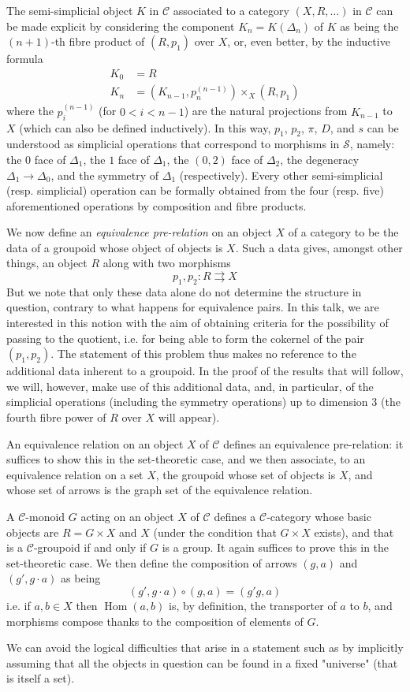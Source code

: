 The semi-simplicial object $K$ in $\mathcal{C}$ associated to a category $(X,R,\ldots)$ in $\mathcal{C}$ can be made explicit by considering the component $K_n=K(\Delta_n)$ of $K$ as being the $(n+1)$-th fibre product of $(R,p_1)$ over $X$, or, even better, by the inductive formula
\[
    \begin{aligned}
        K_0 & = R
        \\K_n &= (K_{n-1},p_n^{(n-1)})\times_X(R,p_1)
    \end{aligned}
\]
where the $p_i^{(n-1)}$ (for $0<i<n-1$) are the natural projections from $K_{n-1}$ to $X$ (which can also be defined inductively).
In this way, $p_1$, $p_2$, $\pi$, $D$, and $s$ can be understood as simplicial operations that correspond to morphisms in $\mathcal{S}$, namely: the $0$ face of $\Delta_1$, the $1$ face of $\Delta_1$, the $(0,2)$ face of $\Delta_2$, the degeneracy $\Delta_1\to\Delta_0$, and the symmetry of $\Delta_1$ (respectively).
Every other semi-simplicial (resp. simplicial) operation can be formally obtained from the four (resp. five) aforementioned operations by composition and fibre products.

We now define an \emph{equivalence pre-relation} on an object $X$ of a category to be the data of a groupoid whose object of objects is $X$.
Such a data gives, amongst other things, an object $R$ along with two morphisms
\[
    p_1,p_2\colon R\rightrightarrows X
\]
But we note that only these data alone do not determine the structure in question, contrary to what happens for equivalence pairs.
In this talk, we are interested in this notion with the aim of obtaining criteria for the possibility of passing to the quotient, i.e. for being able to form the cokernel of the pair $(p_1,p_2)$.
The statement of this problem thus makes no reference to the additional data inherent to a groupoid.
In the proof of the results that will follow, we will, however, make use of this additional data, and, in particular, of the simplicial operations (including the symmetry operations) up to dimension $3$ (the fourth fibre power of $R$ over $X$ will appear).

An equivalence relation on an object $X$ of $\mathcal{C}$ defines an equivalence pre-relation: it suffices to show this in the set-theoretic case, and we then associate, to an equivalence relation on a set $X$, the groupoid whose set of objects is $X$, and whose set of arrows is the graph set of the equivalence relation.

A $\mathcal{C}$-monoid $G$ acting on an object $X$ of $\mathcal{C}$ defines a $\mathcal{C}$-category whose basic objects are $R=G\times X$ and $X$ (under the condition that $G\times X$ exists), and that is a $\mathcal{C}$-groupoid if and only if $G$ is a group.
It again suffices to prove this in the set-theoretic case.
We then define the composition of arrows $(g,a)$ and $(g',g\cdot a)$ as being
\[
    (g',g\cdot a) \circ (g,a) = (g'g,a)
\]
i.e. if $a,b\in X$ then $\operatorname{Hom}(a,b)$ is, by definition, the transporter of $a$ to $b$, and morphisms compose thanks to the composition of elements of $G$.

\begin{remark}\label{fga3.iii-4-remark}
    We can avoid the logical difficulties that arise in a statement such as  by implicitly assuming that all the objects in question can be found in a fixed "universe" (that is itself a set).
\end{remark}
